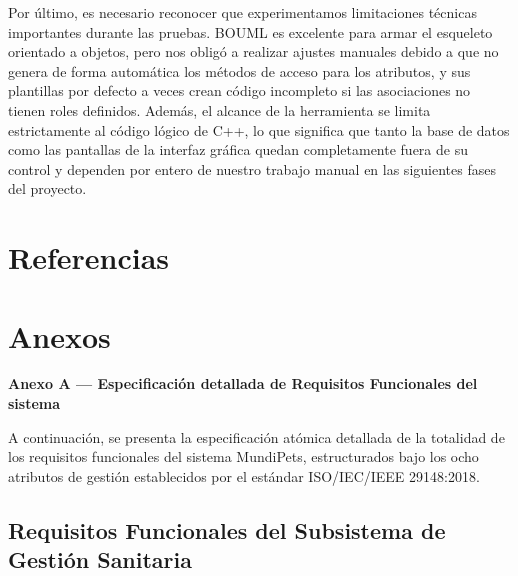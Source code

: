 \documentclass[journal,onecolumn]{IEEEtran}
\begin{document}
	Por último, es necesario reconocer que experimentamos limitaciones técnicas importantes durante las pruebas. BOUML es excelente para armar el esqueleto orientado a objetos, pero nos obligó a realizar ajustes manuales debido a que no genera de forma automática los métodos de acceso para los atributos, y sus plantillas por defecto a veces crean código incompleto si las asociaciones no tienen roles definidos. Además, el alcance de la herramienta se limita estrictamente al código lógico de C++, lo que significa que tanto la base de datos como las pantallas de la interfaz gráfica quedan completamente fuera de su control y dependen por entero de nuestro trabajo manual en las siguientes fases del proyecto.
	
	\newpage
	\section{Referencias}
	
	\printbibliography[heading=none]
	
	\newpage
	\section*{Anexos}
	\textbf{Anexo A --- Especificación detallada de Requisitos Funcionales del sistema}
	\label{anexo:rf_sanitario}
	
	A continuación, se presenta la especificación atómica detallada de la totalidad de los requisitos funcionales del sistema MundiPets, estructurados bajo los ocho atributos de gestión establecidos por el estándar ISO/IEC/IEEE 29148:2018.
	
	\subsection*{Requisitos Funcionales del Subsistema de Gestión Sanitaria}
	
\end{document}
